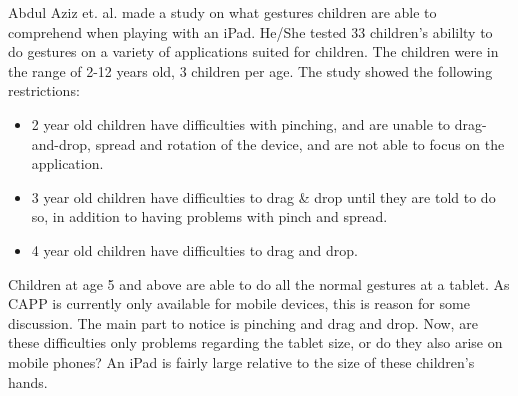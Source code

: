 Abdul Aziz et. al. \cite{aziz2013children} made a study on what gestures children are able to comprehend when playing with an iPad. He/She tested 33 children's abililty to do gestures on a variety of applications suited for children. The children were in the range of 2-12 years old, 3 children per age. The study showed the following restrictions:

\begin{itemize}
  \item 2 year old children have difficulties with pinching, and are unable to drag-and-drop, spread and rotation of the device, and are not able to focus on the application. 
  \item 3 year old children have difficulties to drag \& drop until they are told to do so, in addition to having problems with pinch and spread. 
  \item 4 year old children have difficulties to drag and drop. 
\end{itemize}
Children at age 5 and above are able to do all the normal gestures at a tablet. As CAPP is currently only available for mobile devices, this is reason for some discussion. The main part to notice is pinching and drag and drop. Now, are these difficulties only problems regarding the tablet size, or do they also arise on mobile phones? An iPad is fairly large relative to the size of these children's hands. 

